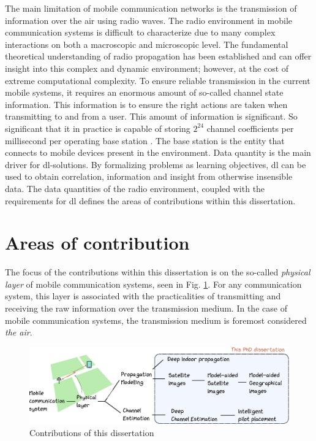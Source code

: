 The main limitation of mobile communication networks is the transmission of information over the air using radio waves. The radio environment in mobile communication systems is difficult to characterize due to many complex interactions on both a macroscopic and microscopic level. The fundamental theoretical understanding of radio propagation has been established and can offer insight into this complex and dynamic environment; however, at the cost of extreme computational complexity. To ensure reliable transmission in the current mobile systems, it requires an enormous amount of so-called channel state information. This information is to ensure the right actions are taken when transmitting to and from a user. This amount of information is significant. So significant that it in practice is capable of storing $2^{24}$ channel coefficients per millisecond per operating base station \cite{Studer2018}. The base station is the entity that connects to mobile devices present in the environment. Data quantity is the main driver for \acrlong{dl}-solutions.  By formalizing problems as learning objectives, \acrlong{dl} can be used to obtain correlation, information and insight from otherwise insensible data. The data quantities of the radio environment, coupled with the requirements for \acrlong{dl} defines the areas of contributions within this dissertation.


\section*{Areas of contribution}
The focus of the contributions within this dissertation is on the so-called \emph{physical layer} of mobile communication systems, seen in Fig. \ref{fig:areas_of_contribution}. For any communication system, this layer is associated with the practicalities of transmitting and receiving the raw information over the transmission medium. In the case of mobile communication systems, the transmission medium is foremost considered \emph{the air}. 


\begin{figure}
\includegraphics[width=\textwidth]{chapters/figures/intro_figure.eps}
\caption{Contributions of this dissertation}\label{fig:areas_of_contribution}
\end{figure}

